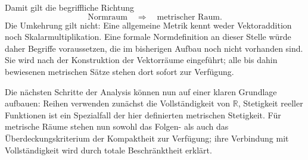 \documentclass[main.tex]{subfiles}
\begin{document}
Damit gilt die begriffliche Richtung
\[
 \text{Normraum}\quad\Longrightarrow\quad\text{metrischer Raum}.
\]
Die Umkehrung gilt nicht: Eine allgemeine Metrik kennt weder Vektoraddition
noch Skalarmultiplikation. Eine formale Normdefinition an dieser Stelle würde
daher Begriffe voraussetzen, die im bisherigen Aufbau noch nicht vorhanden
sind. Sie wird nach der Konstruktion der Vektorräume eingeführt; alle bis
dahin bewiesenen metrischen Sätze stehen dort sofort zur Verfügung.

Die nächsten Schritte der Analysis können nun auf einer klaren Grundlage
aufbauen: Reihen verwenden zunächst die Vollständigkeit von
\(\mathbb R\), Stetigkeit reeller Funktionen ist ein Spezialfall der hier
definierten metrischen Stetigkeit. Für metrische Räume stehen nun sowohl
das Folgen- als auch das Überdeckungskriterium der Kompaktheit zur Verfügung;
ihre Verbindung mit Vollständigkeit wird durch totale Beschränktheit erklärt.
\end{document}

